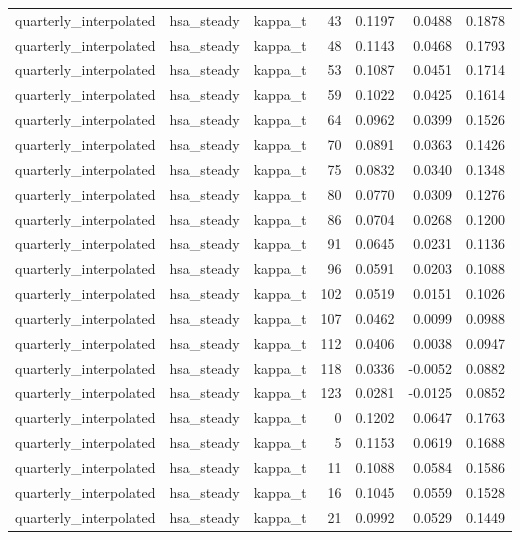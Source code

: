 \begin{tabular}{lllrrrr}
quarterly\_interpolated & hsa\_steady & kappa\_t & 43 & 0.1197 & 0.0488 & 0.1878 \\
quarterly\_interpolated & hsa\_steady & kappa\_t & 48 & 0.1143 & 0.0468 & 0.1793 \\
quarterly\_interpolated & hsa\_steady & kappa\_t & 53 & 0.1087 & 0.0451 & 0.1714 \\
quarterly\_interpolated & hsa\_steady & kappa\_t & 59 & 0.1022 & 0.0425 & 0.1614 \\
quarterly\_interpolated & hsa\_steady & kappa\_t & 64 & 0.0962 & 0.0399 & 0.1526 \\
quarterly\_interpolated & hsa\_steady & kappa\_t & 70 & 0.0891 & 0.0363 & 0.1426 \\
quarterly\_interpolated & hsa\_steady & kappa\_t & 75 & 0.0832 & 0.0340 & 0.1348 \\
quarterly\_interpolated & hsa\_steady & kappa\_t & 80 & 0.0770 & 0.0309 & 0.1276 \\
quarterly\_interpolated & hsa\_steady & kappa\_t & 86 & 0.0704 & 0.0268 & 0.1200 \\
quarterly\_interpolated & hsa\_steady & kappa\_t & 91 & 0.0645 & 0.0231 & 0.1136 \\
quarterly\_interpolated & hsa\_steady & kappa\_t & 96 & 0.0591 & 0.0203 & 0.1088 \\
quarterly\_interpolated & hsa\_steady & kappa\_t & 102 & 0.0519 & 0.0151 & 0.1026 \\
quarterly\_interpolated & hsa\_steady & kappa\_t & 107 & 0.0462 & 0.0099 & 0.0988 \\
quarterly\_interpolated & hsa\_steady & kappa\_t & 112 & 0.0406 & 0.0038 & 0.0947 \\
quarterly\_interpolated & hsa\_steady & kappa\_t & 118 & 0.0336 & -0.0052 & 0.0882 \\
quarterly\_interpolated & hsa\_steady & kappa\_t & 123 & 0.0281 & -0.0125 & 0.0852 \\
quarterly\_interpolated & hsa\_steady & kappa\_t & 0 & 0.1202 & 0.0647 & 0.1763 \\
quarterly\_interpolated & hsa\_steady & kappa\_t & 5 & 0.1153 & 0.0619 & 0.1688 \\
quarterly\_interpolated & hsa\_steady & kappa\_t & 11 & 0.1088 & 0.0584 & 0.1586 \\
quarterly\_interpolated & hsa\_steady & kappa\_t & 16 & 0.1045 & 0.0559 & 0.1528 \\
quarterly\_interpolated & hsa\_steady & kappa\_t & 21 & 0.0992 & 0.0529 & 0.1449 \\

\end{tabular}
